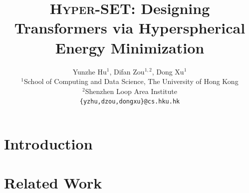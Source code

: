 


\title{\textsc{Hyper-SET}: Designing Transformers via Hyperspherical Energy Minimization}


\author{Yunzhe Hu$^1$, Difan Zou$^{1,2}$, Dong Xu$^1$\\
$^1$School of Computing and Data Science, The University of Hong Kong\\
$^2$Shenzhen Loop Area Institute\\
\texttt{\{yzhu,dzou,dongxu\}@cs.hku.hk} \\
}

%

\newcommand{\fix}{\marginpar{FIX}}
\newcommand{\new}{\marginpar{NEW}}

\iclrfinalcopy %



\maketitle



\section{Introduction}



\section{Related Work}



